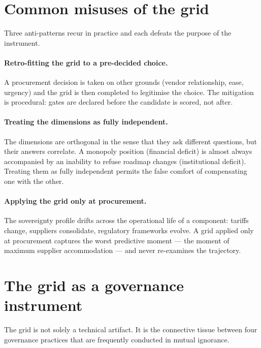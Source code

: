 \section{Common misuses of the grid}
\label{sec:sg-misuses}

Three anti-patterns recur in practice and each defeats the purpose of
the instrument.

\paragraph{Retro-fitting the grid to a pre-decided choice.} A
procurement decision is taken on other grounds (vendor relationship,
ease, urgency) and the grid is then completed to legitimise the
choice. The mitigation is procedural: gates are declared before the
candidate is scored, not after.

\paragraph{Treating the dimensions as fully independent.} The
dimensions are orthogonal in the sense that they ask different
questions, but their answers correlate. A monopoly position
(financial deficit) is almost always accompanied by an inability to
refuse roadmap changes (institutional deficit). Treating them as fully
independent permits the false comfort of compensating one with the
other.

\paragraph{Applying the grid only at procurement.} The sovereignty
profile drifts across the operational life of a component: tariffs
change, suppliers consolidate, regulatory frameworks evolve. A grid
applied only at procurement captures the worst predictive moment ---
the moment of maximum supplier accommodation --- and never re-examines
the trajectory.

\section{The grid as a governance instrument}
\label{sec:sg-governance}

The grid is not solely a technical artifact. It is the connective
tissue between four governance practices that are frequently conducted in mutual
ignorance.

